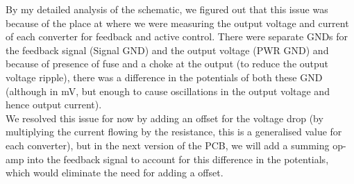\begin{itemize}
    By my detailed analysis of the schematic, we figured out that this issue was because of the place at where we were measuring the output voltage and current of each converter for feedback and active control. There were separate GNDs for the feedback signal (Signal GND) and the output voltage (PWR GND) and because of presence of fuse and a choke at the output (to reduce the output voltage ripple), there was a difference in the potentials of both these GND (although in mV, but enough to cause oscillations in the output voltage and hence output current).\\
    We resolved this issue for now by adding an offset for the voltage drop (by multiplying the current flowing by the resistance, this is a generalised value for each converter), but in the next version of the PCB, we will add a summing op-amp into the feedback signal to account for this difference in the potentials, which would eliminate the need for adding a offset.
\end{itemize}